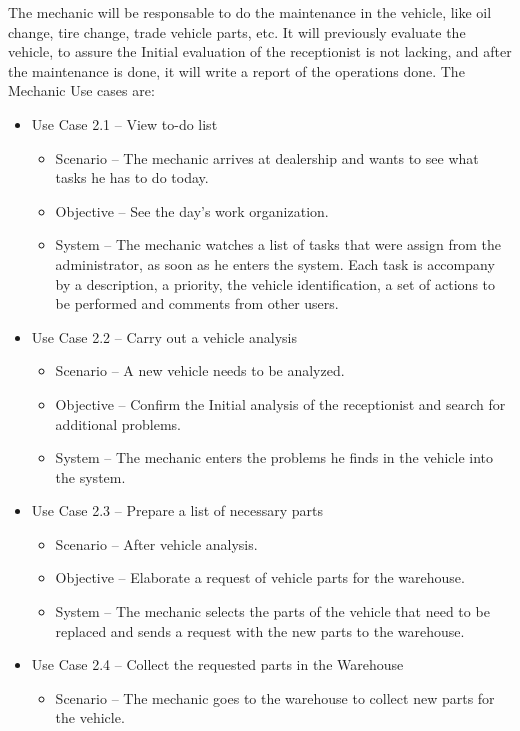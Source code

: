   The mechanic will be responsable to do the maintenance in the vehicle, like oil change, tire change, trade vehicle parts, etc. 
  It will previously evaluate the vehicle, to assure the Initial evaluation of the receptionist is not lacking, and after the maintenance is done, it will write a report of the operations done. 
  The Mechanic Use cases are:

  \begin{itemize}
    \item Use Case 2.1 – View to-do list
    \begin{itemize}
      \item Scenario – The mechanic arrives at dealership and wants to see what tasks he has to do today.
      \item Objective – See the day's work organization.
      \item System – The mechanic watches a list of tasks that were assign from the administrator, as soon as he enters the system. Each task is accompany by a description, a priority, the vehicle identification, a set of actions to be performed and comments from other users. 
    \end{itemize}
    \item Use Case 2.2 – Carry out a vehicle analysis 
    \begin{itemize}
      \item Scenario – A new vehicle needs to be analyzed.
      \item Objective – Confirm the Initial analysis of the receptionist and search for additional problems.
      \item System – The mechanic enters the problems he finds in the vehicle into the system. 
    \end{itemize}
    \item Use Case 2.3 – Prepare a list of necessary parts
    \begin{itemize}
      \item Scenario – After vehicle analysis.
      \item Objective – Elaborate a request of vehicle parts for the warehouse.
      \item System – The mechanic selects the parts of the vehicle that need to be replaced and sends a request with the new parts to the warehouse.
    \end{itemize}
    \item Use Case 2.4 – Collect the requested parts in the Warehouse
    \begin{itemize}
      \item Scenario – The mechanic goes to the warehouse to collect new parts for the vehicle.

\end{itemize}
\end{itemize}
